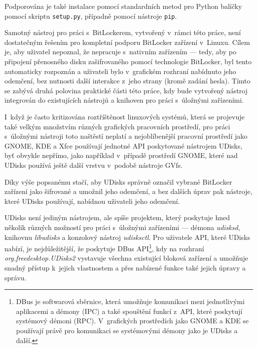 Podporována je také instalace pomocí standardních metod pro Python balíčky pomocí skriptu \texttt{setup.py}, případně pomocí nástroje \texttt{pip}.

\label{sec:integrace}

Samotný nástroj pro práci s~BitLockerem, vytvořený v~rámci této práce, není dos\-ta\-teč\-ným řešením pro kompletní podporu BitLocker zařízení v~Linuxu. Cílem je, aby uživatel nepoznal, že nepracuje s~nativním zařízením --- tedy, aby po připojení přenosného disku zašifrovaného pomocí technologie BitLocker, byl tento automaticky rozpoznán a uživateli bylo v~grafickém rozhraní nabídnuto jeho odemčení, bez nutnosti další interakce z~jeho strany (kromě zadání hesla). Tímto se zabývá druhá polovina praktické části této práce, kdy bude vytvořený nástroj integrován do existujících nástrojů a knihoven pro práci s~úložnými zařízeními.

\label{sec:udisks}

I~když je často kritizována roztříštěnost linuxových systémů, která se projevuje také velkým množstvím různých grafických pracovních prostředí, pro práci s~úložnými ná\-stro\-ji toto naštěstí neplatí a nejoblíbenější pracovní prostředí jako GNOME, KDE a Xfce používají jednotné API poskytované nástrojem UDisks, byť obvykle nepřímo, jako například v~případě prostředí GNOME, které nad UDisks používá ještě další vrstvu v~podobě nástroje GVfs\cite{GVfs2019}.

Díky výše popsanému stačí, aby UDisks správně označil vybrané BitLocker zařízení jako šifrované a umožnil jeho odemčení, a bez dalších úprav pak nástroje, které UDisks používají, nabídnou uživateli jeho odemčení.

UDisks není jediným nástrojem, ale spíše projektem, který poskytuje hned několik různých možností pro práci s~úložnými zařízeními --- démona \emph{udisksd}, knihovnu \emph{libudisks} a konzolový nástroj \emph{udisksctl}\cite{UDisks2018}. Pro uživatele API, které UDisks nabízí, je nejdůležitější, že poskytuje DBus API\footnote{DBus je softwarová sběrnice, která umožňuje komunikaci mezi jednotlivými aplikacemi a démony (IPC) a také spouštění funkcí z~API, které poskytují systémový démoni (RPC). V~grafických prostředích jako GNOME a KDE se používají právě pro komunikaci se systémovými démony jako je UDisks a další.\cite{Palmieri2005}}, kdy na rozhraní \emph{org.freedesktop.UDisks2} vystavuje všechna existující bloková zařízení a umožňuje snadný přístup k~jejich vlastnostem a přes nabízené funkce také jejich úpravy a správu.

